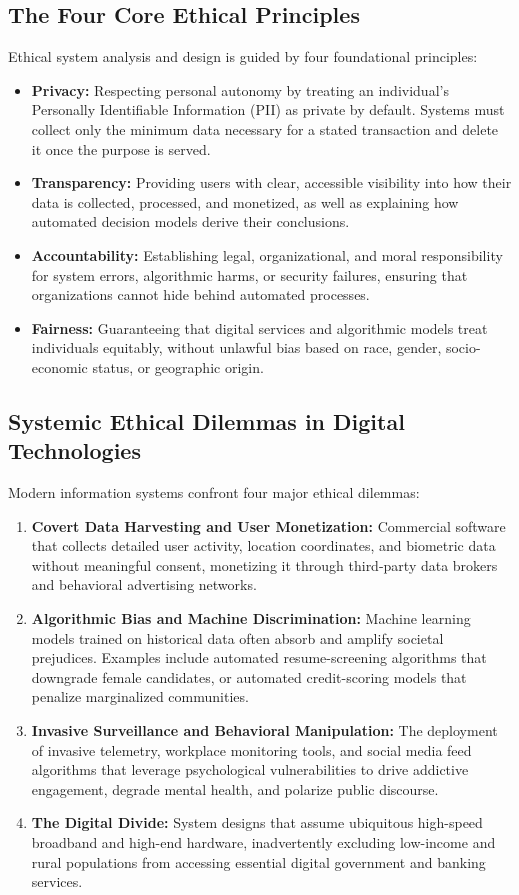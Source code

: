 \documentclass[11pt,a4paper]{article}
\begin{document}
\subsection{The Four Core Ethical Principles}
Ethical system analysis and design is guided by four foundational principles:
\begin{itemize}
    \item \textbf{Privacy:} Respecting personal autonomy by treating an individual's Personally Identifiable Information (PII) as private by default. Systems must collect only the minimum data necessary for a stated transaction and delete it once the purpose is served.
    \item \textbf{Transparency:} Providing users with clear, accessible visibility into how their data is collected, processed, and monetized, as well as explaining how automated decision models derive their conclusions.
    \item \textbf{Accountability:} Establishing legal, organizational, and moral responsibility for system errors, algorithmic harms, or security failures, ensuring that organizations cannot hide behind automated processes.
    \item \textbf{Fairness:} Guaranteeing that digital services and algorithmic models treat individuals equitably, without unlawful bias based on race, gender, socio-economic status, or geographic origin.
\end{itemize}

\subsection{Systemic Ethical Dilemmas in Digital Technologies}
Modern information systems confront four major ethical dilemmas:
\begin{enumerate}
    \item \textbf{Covert Data Harvesting and User Monetization:} Commercial software that collects detailed user activity, location coordinates, and biometric data without meaningful consent, monetizing it through third-party data brokers and behavioral advertising networks.
    \item \textbf{Algorithmic Bias and Machine Discrimination:} Machine learning models trained on historical data often absorb and amplify societal prejudices. Examples include automated resume-screening algorithms that downgrade female candidates, or automated credit-scoring models that penalize marginalized communities.
    \item \textbf{Invasive Surveillance and Behavioral Manipulation:} The deployment of invasive telemetry, workplace monitoring tools, and social media feed algorithms that leverage psychological vulnerabilities to drive addictive engagement, degrade mental health, and polarize public discourse.
    \item \textbf{The Digital Divide:} System designs that assume ubiquitous high-speed broadband and high-end hardware, inadvertently excluding low-income and rural populations from accessing essential digital government and banking services.
\end{enumerate}
\end{document}
